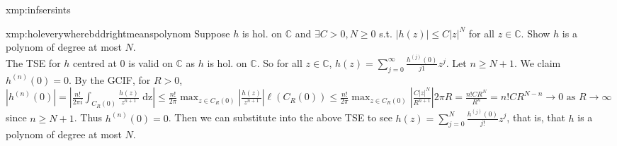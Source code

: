 \documentclass[landscape, 8pt]{extarticle}
\begin{document}
\begin{multicols*}{4}
\begin{xmp}{xmp:infsersints}{ }
		\end{xmp}
		
		
		\begin{xmp-s}{xmp:holeverywherebddrightmeanspolynom}{ }
			Suppose $h$ is hol. on $\mathbb{C}$ and $\exists C >0, N \ge 0$ s.t. $\left|h(z)\right| \le C \left|z\right|^N$ for all $z\in \mathbb{C}$. Show $h$ is a polynom of degree at most $N$.\\
			The TSE for $h$ centred at $0$ is valid on $\mathbb{C}$ as $h$ is hol. on $\mathbb{C}$. So for all $z\in \mathbb{C}$, $h(z) = \sum_{j=0}^{\infty}\frac{h^{(j)}(0)}{j1}z^j$. Let $n \ge N + 1$. We claim $h^{(n)}(0) = 0$. By the GCIF, for $R > 0$, $\left|h^{(n)}(0)\right| = \left|\frac{n!}{2 \pi i} \int_{C_R(0)} \frac{h(z)}{z^{n+1}} \text{ dz}\right|
			\le \frac{n!}{2 \pi} \max_{z \in C_R(0)} \left|\frac{h(z)}{z^{n+1}}\right| \ell(C_R(0))
			\le \frac{n!}{2 \pi} \max_{z \in C_R(0)} \left|\frac{C\left|z\right|^N}{R^{n+1}}\right| 2 \pi R
			= \frac{n! C R^N}{R^n}
			= n!C R^{N-n}
			\to 0 \text{ as } R \to \infty$ since $n \ge N+1$. Thus $h^{(n)}(0) = 0$. Then we can substitute into the above TSE to see $h(z) = \sum_{j=0}^{N}\frac{h^{(j)}(0)}{j!} z^j$, that is, that $h$ is a polynom of degree at most $N$.
			
		\end{xmp-s}
		

\end{multicols*}
\end{document}
